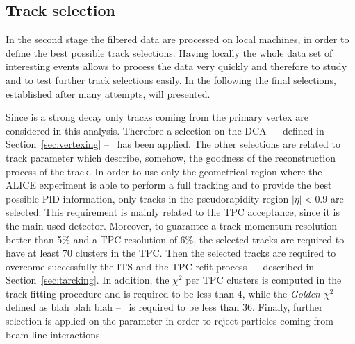 %
\subsection{Track selection} \label{sec:track_sel_crit}

In the second stage the filtered data are processed on local machines, in order to define
the best possible track selections.
Having locally the whole data set of interesting events allows to process the data very 
quickly and therefore to study and to test further track selections easily.
In the following the final selections, established after many attempts, will presented.

Since \dstdecay is a strong decay only tracks coming from the primary vertex are 
considered in this analysis. Therefore a selection on the DCA \ -- defined in 
Section~\ref{sec:vertexing} -- \ has been applied. 
The other selections are related to track parameter which describe, somehow, the goodness of the
reconstruction process of the track. 
In order to use only the geometrical region where the ALICE experiment is able to perform a full
tracking and to provide the best possible PID information, only tracks in the pseudorapidity 
region $|\eta| < 0.9 $ are selected. This requirement is mainly related to the TPC acceptance,
since it is the main used detector. 
Moreover, to guarantee a track momentum resolution better than 5\% and a TPC \dedx resolution of
6\%, the selected tracks are required to have at least 70 clusters in the TPC.
Then the selected tracks are required to overcome successfully the ITS and the TPC refit process
\ -- described in Section~\ref{sec:tarcking}.
In addition, the $\chi^{2}$ per TPC clusters is computed in the track fitting procedure and is
required to be less than 4, while the \textit{Golden $\chi^{2}$} \ -- defined as blah blah blah -- 
\ is required to be less than 36.
Finally, further selection is applied on the  parameter in order to reject
particles coming from beam line interactions.


